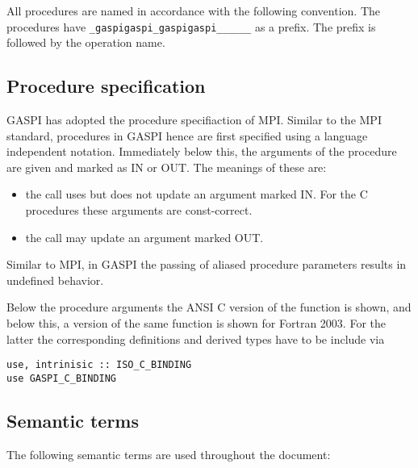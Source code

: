 \documentclass[a4paper]{article}
\makeatletter
\newlength{\st}\setlength{\st}{0pt}
\newcommand{\zerowsep}{\hskip 0pt plus 0.1pt minus 0.1pt}
\newcommand{\ZSEP}[1]{\ifx#1\@@@EOZ@@@\let\next\relax\else\ifx#1\_#1\zerowsep\else#1\fi\let\next\ZSEP\fi\next}
\newcommand{\zsep}[1]{\ZSEP{}#1\@@@EOZ@@@}
\newcommand{\gaspiprefix}{gaspi}
\newcommand{\function}[1]{{\tt #1}}
\newcommand{\gaspifunction}[1]{\function{\protect\zsep{\gaspiprefix\_#1}}}
\newenvironment{cbox}[1]
{\newcommand\colboxcolor{#1}\begin{lrbox}{\riddlebox}\begin{minipage}{\dimexpr\columnwidth-2\fboxsep\relax}}
{\end{minipage}\end{lrbox}\begin{center}\colorbox[HTML]{\colboxcolor}{\usebox{\riddlebox}}\end{center}}
\newenvironment{FDefSign}{\begin{cbox}{EEEEEE}}{\end{cbox}}
\makeatother
\begin{document}
All procedures are named in accordance with the following convention.
The procedures have \gaspifunction{} as a prefix. The prefix
is followed by the operation name.

\subsection{Procedure specification}

GASPI has adopted the procedure specifiaction of MPI. Similar to the MPI standard, procedures in GASPI hence are first specified using a language independent notation. 
Immediately below this, the arguments of the procedure are given and marked as IN or OUT. The meanings of these are:

\begin{itemize}
\item the call uses but does not update an argument marked IN. For the C procedures these arguments are const-correct.
\item the call may update an argument marked OUT.
\end{itemize}

Similar to MPI, in GASPI the passing of aliased procedure parameters results in undefined behavior.  

Below the procedure arguments the ANSI C version of the function is shown, and below this, a version of the same function is shown for Fortran 2003. For the latter the corresponding definitions and derived types have to be include via  

\begin{FDefSign}
\begin{verbatim}
use, intrinisic :: ISO_C_BINDING
use GASPI_C_BINDING
\end{verbatim}
\end{FDefSign}



\subsection{Semantic terms}

The following semantic terms are used throughout the document:

\newcommand{\septext}{0.5em}
\newcommand{\gentextwithline}[6]{
\draw (#2,#3) node[left] {#1};
\draw[#6] (#2+\septext+#4,#3) -- +(#5,0);
}
\newcommand{\timeline}[1]{\gentextwithline{Time}{0}{#1}{0}{25em}{->,dashed}}
\newcommand{\operation}[2]{\gentextwithline{Operation}{0}{#1}{1em}{#2}{|-|}}
\newcommand{\gencall}[3]{\gentextwithline{#1}{0}{#2}{0}{#3}{|-|}}
\newcommand{\call}[2]{\gencall{Call}{#1}{#2}}
\newcommand{\calls}[2]{\gencall{Calls}{#1}{#2-10em};
\draw[|-|] (#2-8em,#1) -- +(8em,0);
}
\newcommand{\wait}[3]{\gentextwithline{Wait}{#1}{#2}{0}{#3}{|-|}}
\newcommand{\progress}[2]{\gentextwithline{Progress}{0}{#1}{1em}{#2}{|-|}}
\end{document}

